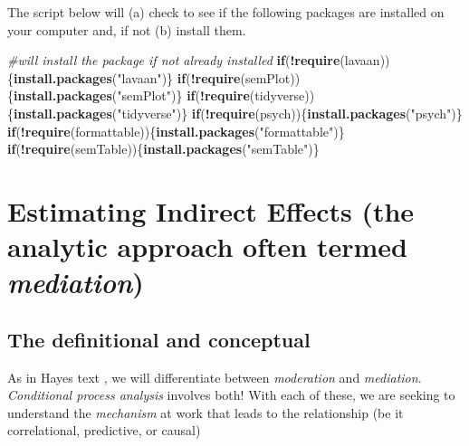 \documentclass[
  11pt,
]{book}
\newenvironment{Shaded}{\begin{snugshade}}{\end{snugshade}}
\newcommand{\CommentTok}[1]{\textcolor[rgb]{0.37,0.37,0.37}{\textit{#1}}}
\newcommand{\ControlFlowTok}[1]{\textcolor[rgb]{0.27,0.27,0.27}{\textbf{#1}}}
\newcommand{\FunctionTok}[1]{\textcolor[rgb]{0.27,0.27,0.27}{\textbf{#1}}}
\newcommand{\NormalTok}[1]{#1}
\newcommand{\SpecialCharTok}[1]{\textcolor[rgb]{0.43,0.43,0.43}{\textbf{#1}}}
\newcommand{\StringTok}[1]{\textcolor[rgb]{0.5,0.5,0.5}{#1}}
\begin{document}
The script below will (a) check to see if the following packages are installed on your computer and, if not (b) install them.

\begin{Shaded}
\begin{Highlighting}[]
\CommentTok{\#will install the package if not already installed}
\ControlFlowTok{if}\NormalTok{(}\SpecialCharTok{!}\FunctionTok{require}\NormalTok{(lavaan))\{}\FunctionTok{install.packages}\NormalTok{(}\StringTok{"lavaan"}\NormalTok{)\}}
\ControlFlowTok{if}\NormalTok{(}\SpecialCharTok{!}\FunctionTok{require}\NormalTok{(semPlot))\{}\FunctionTok{install.packages}\NormalTok{(}\StringTok{"semPlot"}\NormalTok{)\}}
\ControlFlowTok{if}\NormalTok{(}\SpecialCharTok{!}\FunctionTok{require}\NormalTok{(tidyverse))\{}\FunctionTok{install.packages}\NormalTok{(}\StringTok{"tidyverse"}\NormalTok{)\}}
\ControlFlowTok{if}\NormalTok{(}\SpecialCharTok{!}\FunctionTok{require}\NormalTok{(psych))\{}\FunctionTok{install.packages}\NormalTok{(}\StringTok{"psych"}\NormalTok{)\}}
\ControlFlowTok{if}\NormalTok{(}\SpecialCharTok{!}\FunctionTok{require}\NormalTok{(formattable))\{}\FunctionTok{install.packages}\NormalTok{(}\StringTok{"formattable"}\NormalTok{)\}}
\ControlFlowTok{if}\NormalTok{(}\SpecialCharTok{!}\FunctionTok{require}\NormalTok{(semTable))\{}\FunctionTok{install.packages}\NormalTok{(}\StringTok{"semTable"}\NormalTok{)\}}
\end{Highlighting}
\end{Shaded}

\hypertarget{estimating-indirect-effects-the-analytic-approach-often-termed-mediation}{%
\section{\texorpdfstring{Estimating Indirect Effects (the analytic approach often termed \emph{mediation})}{Estimating Indirect Effects (the analytic approach often termed mediation)}}\label{estimating-indirect-effects-the-analytic-approach-often-termed-mediation}}

\hypertarget{the-definitional-and-conceptual}{%
\subsection{The definitional and conceptual}\label{the-definitional-and-conceptual}}

As in Hayes text \citeyearpar{hayes_introduction_2018}, we will differentiate between \emph{moderation} and \emph{mediation}. \emph{Conditional process analysis} involves both! With each of these, we are seeking to understand the \emph{mechanism} at work that leads to the relationship (be it correlational, predictive, or causal)
\end{document}
